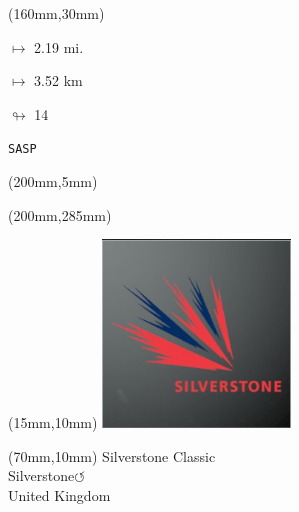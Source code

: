 \begin{textblock*}{40mm}(160mm,30mm)%
\Large
\par$\mapsto$ 2.19 mi.
\par$\mapsto$ 3.52 km
\par$\looparrowright$ 14
\par\hfill\tiny\tt SASP\\
\end{textblock*}
\begin{textblock*}{20mm}(200mm,5mm)%
\fbox{\thepage}
\label{SASP}
\end{textblock*}
\begin{textblock*}{20mm}(200mm,285mm)%
\fbox{\thepage}
\end{textblock*}

\null\newpage
\begin{textblock*}{50mm}(15mm,10mm)%
\includegraphics[width=50mm]{LG/2015-05-20_00094.png}
\end{textblock*}
\begin{textblock*}{130mm}(70mm,10mm)%
{\fontsize{20}{20}\selectfont Silverstone Classic\\}
{\fontsize{16}{16}\selectfont Silverstone\hfill \huge$\circlearrowleft$\\}
{\fontsize{12}{12}\selectfont United Kingdom\\}
\end{textblock*}
